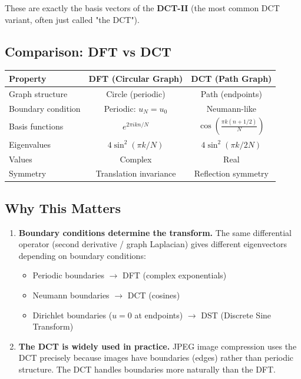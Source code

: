 \begin{notechapter}
These are exactly the basis vectors of the \textbf{DCT-II} (the most 
common DCT variant, often just called "the DCT").

\subsection{Comparison: DFT vs DCT}

\begin{center}
\renewcommand{\arraystretch}{1.4}
\begin{tabular}{lcc}
\toprule
\textbf{Property} & \textbf{DFT (Circular Graph)} & \textbf{DCT (Path Graph)} \\
\midrule
Graph structure & Circle (periodic) & Path (endpoints) \\
Boundary condition & Periodic: $u_{N} = u_0$ & Neumann-like \\
Basis functions & $e^{2\pi i kn/N}$ & $\cos\left(\frac{\pi k(n+1/2)}{N}\right)$ \\
Eigenvalues & $4\sin^2(\pi k/N)$ & $4\sin^2(\pi k/2N)$ \\
Values & Complex & Real \\
Symmetry & Translation invariance & Reflection symmetry \\
\bottomrule
\end{tabular}
\end{center}

\subsection{Why This Matters}

\begin{enumerate}
\item \textbf{Boundary conditions determine the transform.} The same 
      differential operator (second derivative / graph Laplacian) gives 
      different eigenvectors depending on boundary conditions:
      \begin{itemize}
          \item Periodic boundaries $\rightarrow$ DFT (complex exponentials)
          \item Neumann boundaries $\rightarrow$ DCT (cosines)
          \item Dirichlet boundaries ($u = 0$ at endpoints) $\rightarrow$ 
                DST (Discrete Sine Transform)
      \end{itemize}

\item \textbf{The DCT is widely used in practice.} JPEG image compression 
      uses the DCT precisely because images have boundaries (edges) rather 
      than periodic structure. The DCT handles boundaries more naturally 
      than the DFT.


\end{enumerate}
\end{notechapter}
